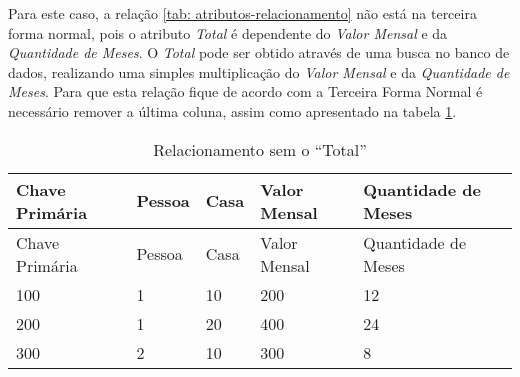     
Para este caso, a relação \ref{tab: atributos-relacionamento} não está na terceira forma normal, pois o atributo \textit{Total} é dependente do \textit{Valor Mensal} e da \textit{Quantidade de Meses}. O \textit{Total} pode ser obtido através de uma busca no banco de dados, realizando uma simples multiplicação do \textit{Valor Mensal} e da \textit{Quantidade de Meses}. Para que esta relação fique de acordo com a Terceira Forma Normal é necessário remover a última coluna, assim como apresentado na tabela \ref{tab: total-a-pagar-removido}.
    
\begin{longtable}[]{@{}lllll@{}}
\caption{Relacionamento sem o ``Total'' \label{tab: total-a-pagar-removido}}\tabularnewline
\toprule
Chave Primária & Pessoa & Casa & Valor Mensal & Quantidade de Meses\tabularnewline
\midrule
\endfirsthead
\toprule
Chave Primária & Pessoa & Casa & Valor Mensal & Quantidade de Meses\tabularnewline
\midrule
\endhead
100 & 1 & 10 & 200 & 12\tabularnewline
200 & 1 & 20 & 400 & 24\tabularnewline
300 & 2 & 10 & 300 & 8\tabularnewline
\bottomrule
\end{longtable}

